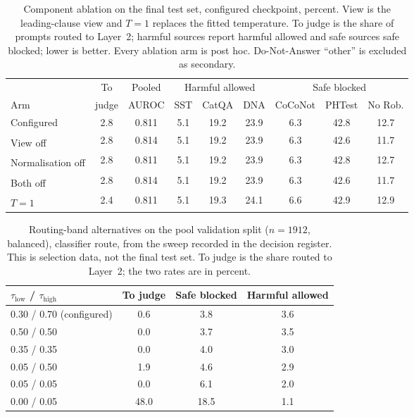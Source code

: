 \documentclass[journal]{IEEEtran}
\newcommand{\posthoc}{\textsuperscript{\dag}}
\begin{document}
\setcounter{table}{8}
\begin{table}[h]
\caption{Component ablation on the final test set, configured checkpoint,
percent. View is the leading-clause view and $T=1$ replaces the fitted
temperature. To judge is the share of prompts routed to Layer~2; harmful sources
report harmful allowed and safe sources safe blocked; lower is better. Every
ablation arm is post hoc. Do-Not-Answer ``other'' is excluded as secondary.}
\label{abr:tab:ablation}
\centering
\scriptsize
\setlength{\tabcolsep}{2.5pt}
\begin{tabular}{@{}lcccccccc@{}}
\toprule
& To & Pooled & \multicolumn{3}{c}{Harmful allowed} & \multicolumn{3}{c}{Safe blocked} \\
\cmidrule(lr){4-6}\cmidrule(lr){7-9}
Arm & judge & AUROC & SST & CatQA & DNA & CoCoNot & PHTest & No Rob. \\
\midrule
Configured                 & 2.8 & 0.811 & 5.1 & 19.2 & 23.9 & 6.3 & 42.8 & 12.7 \\
View off\posthoc            & 2.8 & 0.814 & 5.1 & 19.2 & 23.9 & 6.3 & 42.6 & 11.7 \\
Normalisation off\posthoc  & 2.8 & 0.811 & 5.1 & 19.2 & 23.9 & 6.3 & 42.8 & 12.7 \\
Both off\posthoc           & 2.8 & 0.814 & 5.1 & 19.2 & 23.9 & 6.3 & 42.6 & 11.7 \\
$T=1$\posthoc               & 2.4 & 0.811 & 5.1 & 19.3 & 24.1 & 6.6 & 42.9 & 12.9 \\
\bottomrule
\end{tabular}
\end{table}

\setcounter{table}{9}
\begin{table}[h]
\caption{Routing-band alternatives on the pool validation split ($n=1912$,
balanced), classifier route, from the sweep recorded in the decision register.
This is selection data, not the final test set. To judge is the share routed
to Layer~2; the two rates are in percent.}
\label{abr:tab:sweep}
\centering
\footnotesize
\begin{tabular}{@{}lccc@{}}
\toprule
$\tau_{\mathrm{low}}$ / $\tau_{\mathrm{high}}$ & To judge & Safe blocked & Harmful allowed \\
\midrule
0.30 / 0.70 (configured) & 0.6 & 3.8 & 3.6 \\
0.50 / 0.50              & 0.0 & 3.7 & 3.5 \\
0.35 / 0.35              & 0.0 & 4.0 & 3.0 \\
0.05 / 0.50              & 1.9 & 4.6 & 2.9 \\
0.05 / 0.05              & 0.0 & 6.1 & 2.0 \\
0.00 / 0.05              & 48.0 & 18.5 & 1.1 \\
\bottomrule
\end{tabular}
\end{table}
\end{document}
